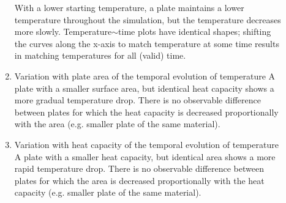 \begin{description}
\begin{enumerate}
      With a lower starting temperature, a plate maintains a lower temperature
      throughout the simulation, but the temperature decreases more slowly.
      Temperature$\sim$time plots have identical shapes; shifting the curves along
      the x-axis to match temperature at some time results in matching
      temperatures for all (valid) time.
    \item{Variation with plate area of the temporal evolution of temperature}\newline
      A plate with a smaller surface area, but identical heat capacity shows a
      more gradual temperature drop.  There is no observable difference between
      plates for which the heat capacity is decreased proportionally with the
      area (e.g. smaller plate of the same material).
    \item{Variation with heat capacity of the temporal evolution of temperature}\newline
      A plate with a smaller heat capacity, but identical area shows a
      more rapid temperature drop.  There is no observable difference between
      plates for which the area is decreased proportionally with the heat
      capacity (e.g. smaller plate of the same material).
    \end{enumerate}


\end{description}
